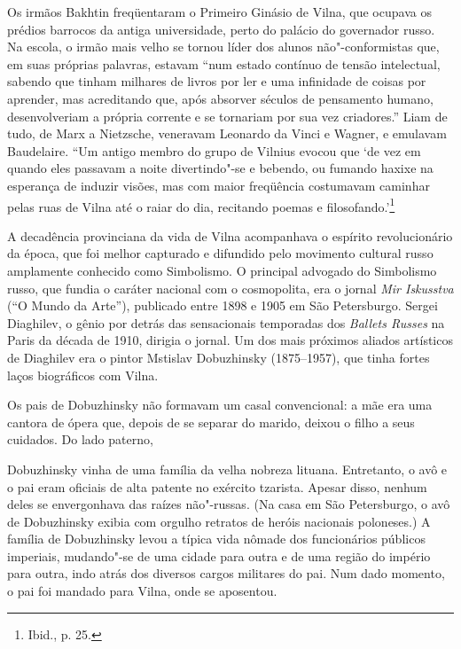 Os irmãos Bakhtin freqüentaram o Primeiro Ginásio de Vilna, que ocupava
os prédios barrocos da antiga universidade, perto do palácio do
governador russo. Na escola, o irmão mais velho se tornou líder dos
alunos não"-conformistas que, em suas próprias palavras, estavam ``num
estado contínuo de tensão intelectual, sabendo que tinham milhares de
livros por ler e uma infinidade de coisas por aprender, mas acreditando
que, após absorver séculos de pensamento humano, desenvolveriam a
própria corrente e se tornariam por sua vez criadores.'' Liam de tudo,
de Marx a Nietzsche, veneravam Leonardo da Vinci e Wagner, e emulavam
Baudelaire. ``Um antigo membro do grupo de Vilnius evocou que `de vez em
quando eles passavam a noite divertindo"-se e bebendo, ou fumando haxixe
na esperança de induzir visões, mas com maior freqüência costumavam
caminhar pelas ruas de Vilna até o raiar do dia, recitando poemas e
filosofando.'\footnote{Ibid., p. 25.}

\asterisc

A decadência provinciana da vida de Vilna acompanhava o espírito
revolucionário da época, que foi melhor capturado e difundido pelo
movimento cultural russo amplamente conhecido como Simbolismo. O
principal advogado do Simbolismo russo, que fundia o caráter nacional
com o cosmopolita, era o jornal \emph{Mir Iskusstva} (``O Mundo da
Arte''), publicado entre 1898 e 1905 em São Petersburgo. Sergei
Diaghilev, o gênio por detrás das sensacionais temporadas dos
\emph{Ballets Russes} na Paris da década de 1910, dirigia o jornal. Um
dos mais próximos aliados artísticos de Diaghilev era o pintor Mstislav
Dobuzhinsky (1875--1957), que tinha fortes laços biográficos com Vilna.

Os pais de Dobuzhinsky não formavam um casal convencional: a mãe era uma
cantora de ópera que, depois de se separar do marido, deixou o filho a
seus cuidados. Do lado paterno,\linebreak

\noindent{}Dobuzhinsky vinha de uma família da
velha nobreza lituana. Entretanto, o avô e o pai eram oficiais de alta
patente no exército tzarista. Apesar disso, nenhum deles se envergonhava
das raízes não"-russas. (Na casa em São Petersburgo, o avô de Dobuzhinsky
exibia com orgulho retratos de heróis nacionais poloneses.) A família de
Dobuzhinsky levou a típica vida nômade dos funcionários públicos
imperiais, mudando"-se de uma cidade para outra e de uma região do
império para outra, indo atrás dos diversos cargos militares do pai. Num
dado momento, o pai foi mandado para Vilna, onde se aposentou.


